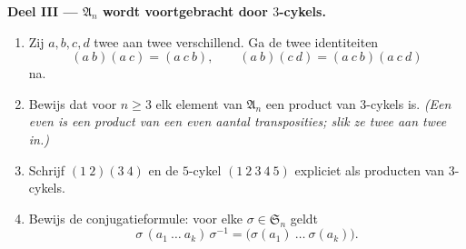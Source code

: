 \begin{problem}
\medskip
\noindent\textbf{Deel III --- $\mathfrak A_n$ wordt voortgebracht door
$3$-cykels.}
\begin{enumerate}[resume]
  \item Zij $a, b, c, d$ twee aan twee verschillend. Ga de twee
        identiteiten
        \[
        (a\ b)(a\ c) = (a\ c\ b),
        \qquad
        (a\ b)(c\ d) = (a\ c\ b)(a\ c\ d)
        \]
        na.
  \item Bewijs dat voor $n \geq 3$ elk element van $\mathfrak A_n$ een
        product van $3$-cykels is. \emph{(Een even  is een
        product van een even aantal transposities; slik ze twee aan twee
        in.)}
  \item Schrijf $(1\ 2)(3\ 4)$ en de $5$-cykel $(1\ 2\ 3\ 4\ 5)$
        expliciet als producten van $3$-cykels.
  \item Bewijs de conjugatieformule: voor elke $\sigma \in \mathfrak
        S_n$ geldt
        \[
        \sigma\,(a_1\ \dots\ a_k)\,\sigma^{-1}
        = \bigl(\sigma(a_1)\ \dots\ \sigma(a_k)\bigr) .
        \]
\end{enumerate}


\end{problem}
